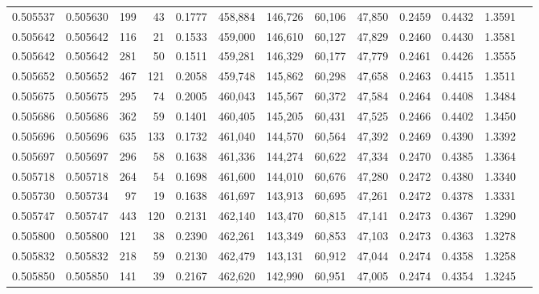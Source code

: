 \begin{tabular}{rrrrrrrrrrrrr}
0.505537 & 0.505630 &   199 &    43 &                                     0.1777 & 458,884 & 146,726 &  60,106 &  47,850 & 0.2459 & 0.4432 & 1.3591 \\
0.505642 & 0.505642 &   116 &    21 &                                     0.1533 & 459,000 & 146,610 &  60,127 &  47,829 & 0.2460 & 0.4430 & 1.3581 \\
0.505642 & 0.505642 &   281 &    50 &                                     0.1511 & 459,281 & 146,329 &  60,177 &  47,779 & 0.2461 & 0.4426 & 1.3555 \\
0.505652 & 0.505652 &   467 &   121 &                                     0.2058 & 459,748 & 145,862 &  60,298 &  47,658 & 0.2463 & 0.4415 & 1.3511 \\
0.505675 & 0.505675 &   295 &    74 &                                     0.2005 & 460,043 & 145,567 &  60,372 &  47,584 & 0.2464 & 0.4408 & 1.3484 \\
0.505686 & 0.505686 &   362 &    59 &                                     0.1401 & 460,405 & 145,205 &  60,431 &  47,525 & 0.2466 & 0.4402 & 1.3450 \\
0.505696 & 0.505696 &   635 &   133 &                                     0.1732 & 461,040 & 144,570 &  60,564 &  47,392 & 0.2469 & 0.4390 & 1.3392 \\
0.505697 & 0.505697 &   296 &    58 &                                     0.1638 & 461,336 & 144,274 &  60,622 &  47,334 & 0.2470 & 0.4385 & 1.3364 \\
0.505718 & 0.505718 &   264 &    54 &                                     0.1698 & 461,600 & 144,010 &  60,676 &  47,280 & 0.2472 & 0.4380 & 1.3340 \\
0.505730 & 0.505734 &    97 &    19 &                                     0.1638 & 461,697 & 143,913 &  60,695 &  47,261 & 0.2472 & 0.4378 & 1.3331 \\
0.505747 & 0.505747 &   443 &   120 &                                     0.2131 & 462,140 & 143,470 &  60,815 &  47,141 & 0.2473 & 0.4367 & 1.3290 \\
0.505800 & 0.505800 &   121 &    38 &                                     0.2390 & 462,261 & 143,349 &  60,853 &  47,103 & 0.2473 & 0.4363 & 1.3278 \\
0.505832 & 0.505832 &   218 &    59 &                                     0.2130 & 462,479 & 143,131 &  60,912 &  47,044 & 0.2474 & 0.4358 & 1.3258 \\
0.505850 & 0.505850 &   141 &    39 &                                     0.2167 & 462,620 & 142,990 &  60,951 &  47,005 & 0.2474 & 0.4354 & 1.3245 \\

\end{tabular}
